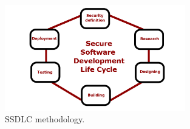 \documentclass{article} %
\begin{document}
\begin{figure}[ht]
  \centering
      \includegraphics[width=0.7\textwidth]{ssdlc.png}
  \caption{SSDLC methodology.}
  \label{fig:ssdlc}
\end{figure}\\
\newline
\end{document}
